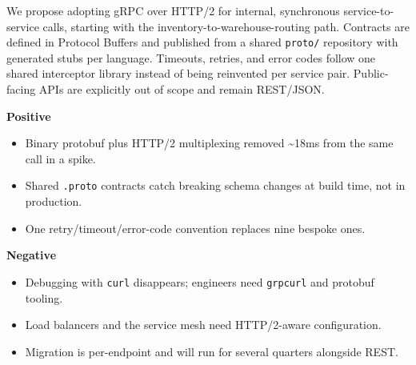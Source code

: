 \documentclass[10pt]{article}
\begin{document}
\begin{decbox}
We propose adopting gRPC over HTTP/2 for internal, synchronous service-to-service calls, starting with the inventory-to-warehouse-routing path. Contracts are defined in Protocol Buffers and published from a shared \texttt{proto/} repository with generated stubs per language. Timeouts, retries, and error codes follow one shared interceptor library instead of being reinvented per service pair. Public-facing APIs are explicitly out of scope and remain REST/JSON.
\end{decbox}

\begin{consbox}
\noindent
\begin{minipage}[t]{0.48\linewidth}
\textbf{\textcolor{adrgreen}{Positive}}
\begin{itemize}
\item[\textcolor{adrgreen}{\faCheckCircle}] Binary protobuf plus HTTP/2 multiplexing removed \textasciitilde18ms from the same call in a spike.
\item[\textcolor{adrgreen}{\faCheckCircle}] Shared \texttt{.proto} contracts catch breaking schema changes at build time, not in production.
\item[\textcolor{adrgreen}{\faCheckCircle}] One retry/timeout/error-code convention replaces nine bespoke ones.
\end{itemize}
\end{minipage}\hfill
\begin{minipage}[t]{0.48\linewidth}
\textbf{\textcolor{adrred}{Negative}}
\begin{itemize}
\item[\textcolor{adrred}{\faTimesCircle}] Debugging with \texttt{curl} disappears; engineers need \texttt{grpcurl} and protobuf tooling.
\item[\textcolor{adrred}{\faTimesCircle}] Load balancers and the service mesh need HTTP/2-aware configuration.
\item[\textcolor{adrred}{\faTimesCircle}] Migration is per-endpoint and will run for several quarters alongside REST.
\end{itemize}
\end{minipage}
\end{consbox}
\end{document}
